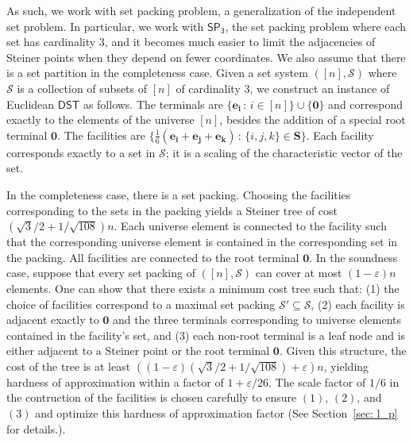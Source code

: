 \documentclass{theoretics}
\newcommand{\1}{\textbf{1}}
\newcommand{\setpT}{$\mathsf{SP_3}$\xspace}
\newcommand{\dst}{$\mathsf{DST}$\xspace}
\begin{document}

As such, we work with set packing problem, a generalization of the independent set problem. In particular, we work with \setpT, the set packing problem where each set has cardinality $3$, and it becomes much easier to limit the adjacencies of Steiner points when they depend on fewer coordinates.  We also assume that there is a set partition in the completeness case. Given a set system $([n], \mathcal{S})$ where $\mathcal{S}$ is a collection of subsets of $[n]$ of cardinality $3$, we construct an instance of Euclidean \dst as follows. The terminals are $\{ \mathbf{e_i} \,:\, i \in [n]\} \cup \{\mathbf{0}\}$ and correspond exactly to the elements of the universe $[n]$, besides the addition of a special root terminal $\mathbf{0}$. The facilities are $\{\frac{1}{6}(\mathbf{e_i} + \mathbf{e_j} + \mathbf{e_k}) \,:\, \{i,j,k\} \in \mathbf{S}\}$. Each facility corresponds exactly to a set in $\mathcal{S}$; it is a scaling of the characteristic vector of the set.

In the completeness case, there is a set packing. Choosing the facilities corresponding to the sets in the packing yields a Steiner tree of cost $(\sqrt{3}/2 + 1/\sqrt{108})n$. Each universe element is connected to the facility such that the corresponding universe element is contained in the corresponding set in the packing. All facilities are connected to the root terminal $\mathbf{0}$. In the soundness case, suppose that every set packing of $([n], \mathcal{S})$ can cover at most $(1-\varepsilon)n$ elements. One can show that there exists a minimum cost tree such that: (1) the choice of facilities correspond to a maximal set packing $\mathcal{S}' \subseteq \mathcal{S}$, (2) each facility is adjacent exactly to $\mathbf{0}$ and the three terminals corresponding to universe elements contained in the facility's set, and (3) each non-root terminal is a leaf node and is either adjacent to a Steiner point or the root terminal $\mathbf{0}$. Given this structure, the cost of the tree is at least $((1 - \varepsilon)(\sqrt{3}/2 + 1/\sqrt{108}) + \varepsilon)n$, yielding hardness of approximation within a factor of  $1 + \varepsilon/26$. The scale factor of $1/6$ in the contruction of the facilities is chosen carefully to ensure $(1)$, $(2)$, and $(3)$ and optimize this hardness of approximation factor (See Section~\ref{sec: l_p} for details.). 
\end{document}
